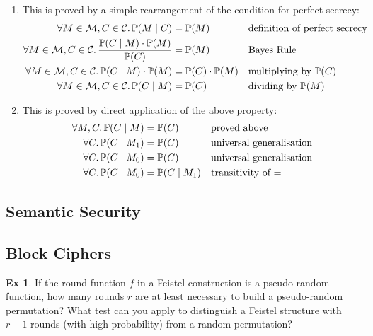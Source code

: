 \documentclass[10pt,\jkfside,a4paper]{article}
\theoremstyle{definition}
\newtheorem{ex}{Ex}
\begin{document}
\begin{enumerate}[label=(\textit{\alph*})]

    \item This is proved by a simple rearrangement of the condition for perfect secrecy:
    \begin{align*}
        \forall M \in \mathcal M, C \in \mathcal C\ldotp \mathbb{P}(M \mid C) &= \mathbb{P}(M) &&\text{definition of perfect secrecy} \\
        \forall M \in \mathcal M, C \in \mathcal C\ldotp \frac{\mathbb{P}(C \mid M) \cdot \mathbb{P}(M)}{\mathbb{P}(C)} &= \mathbb{P}(M) &&\text{Bayes Rule} \\
        \forall M \in \mathcal M, C \in \mathcal C\ldotp \mathbb{P}(C \mid M) \cdot \mathbb{P}(M) &= \mathbb{P}(C) \cdot \mathbb{P}(M) &&\text{multiplying by $\mathbb{P}(C)$} \\
        \forall M \in \mathcal M, C \in \mathcal C\ldotp \mathbb{P}(C \mid M) &= \mathbb{P}(C) &&\text{dividing by $\mathbb{P}(M)$}
    \end{align*}

    \item This is proved by direct application of the above property:
    \begin{align*}
        \forall M, C\ldotp \mathbb{P}(C \mid M) &= \mathbb{P}(C) &&\text{proved above} \\
        \forall C\ldotp \mathbb{P}(C \mid M_1) &= \mathbb{P}(C) &&\text{universal generalisation} \\
        \forall C\ldotp \mathbb{P}(C \mid M_0) &= \mathbb{P}(C) &&\text{universal generalisation} \\
        \forall C\ldotp \mathbb{P}(C \mid M_0) &= \mathbb{P}(C \mid M_1) &&\text{transitivity of $=$}
    \end{align*}

\end{enumerate}

\subsection{Semantic Security}

\subsection{Block Ciphers}

\begin{ex}

    If the round function $f$ in a Feistel construction is a pseudo-random function, how many rounds $r$ are at least necessary to build a pseudo-random permutation? What test can you apply to distinguish a Feistel structure with $r - 1$ rounds (with high probability) from a random permutation?

\end{ex}
\end{document}
